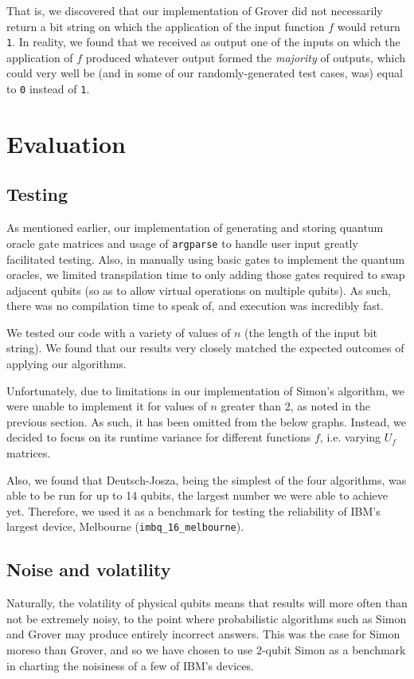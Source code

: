 \documentclass[12pt]{article}
\begin{document}
That is, we discovered that our implementation of Grover did not necessarily return a bit string on which the application of the input function $f$ would return \texttt{1}.
In reality, we found that we received as output one of the inputs on which the application of $f$ produced whatever output formed the \textit{majority} of outputs, which could very well be (and in some of our randomly-generated test cases, was) equal to \texttt{0} instead of \texttt{1}.

\section{Evaluation}

\subsection{Testing}

As mentioned earlier, our implementation of generating and storing quantum oracle gate matrices and usage of \texttt{argparse} to handle user input greatly facilitated testing.
Also, in manually using basic gates to implement the quantum oracles, we limited transpilation time to only adding those gates required to swap adjacent qubits (so as to allow virtual operations on multiple qubits).
As such, there was no compilation time to speak of, and execution was incredibly fast.

We tested our code with a variety of values of $n$ (the length of the input bit string).
We found that our results very closely matched the expected outcomes of applying our algorithms.

Unfortunately, due to limitations in our implementation of Simon's algorithm, we were unable to implement it for values of $n$ greater than 2, as noted in the previous section.
As such, it has been omitted from the below graphs.
Instead, we decided to focus on its runtime variance for different functions $f$, i.e. varying $U_f$ matrices.

Also, we found that Deutsch-Josza, being the simplest of the four algorithms, was able to be run for up to 14 qubits, the largest number we were able to achieve yet.
Therefore, we used it as a benchmark for testing the reliability of IBM's largest device, Melbourne (\texttt{imbq\_16\_melbourne}).

\subsection{Noise and volatility}
Naturally, the volatility of physical qubits means that results will more often than not be extremely noisy, to the point where probabilistic algorithms such as Simon and Grover may produce entirely incorrect answers.
This was the case for Simon moreso than Grover, and so we have chosen to use 2-qubit Simon as a benchmark in charting the noisiness of a few of IBM's devices.
\end{document}
